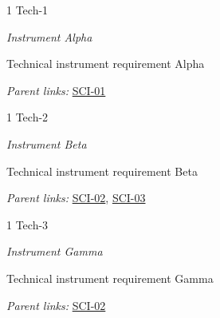 \begin{frame}{1 Tech-1}

\emph{Instrument Alpha}

Technical instrument requirement Alpha

\emph{Parent links:} \href{L2.html\#SCI-01}{SCI-01}

\end{frame}

\begin{frame}{1 Tech-2}

\emph{Instrument Beta}

Technical instrument requirement Beta

\emph{Parent links:} \href{L2.html\#SCI-02}{SCI-02},
\href{L2.html\#SCI-03}{SCI-03}

\end{frame}

\begin{frame}{1 Tech-3}

\emph{Instrument Gamma}

Technical instrument requirement Gamma

\emph{Parent links:} \href{L2.html\#SCI-02}{SCI-02}

\end{frame}
